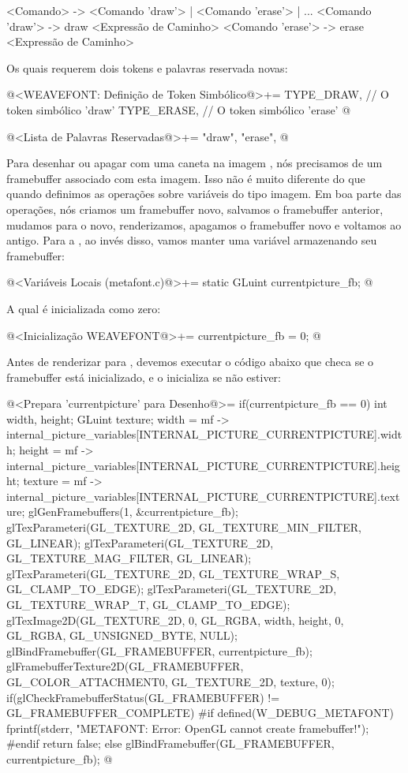{{{{{{\alinhaverbatim
<Comando> -> <Comando 'draw'> | <Comando 'erase'> | ...
<Comando 'draw'> -> draw <Expressão de Caminho>
<Comando 'erase'> -> erase <Expressão de Caminho>
\alinhanormal

Os quais requerem dois tokens e palavras reservada novas:

\iniciocodigo
@<WEAVEFONT: Definição de Token Simbólico@>+=
TYPE_DRAW,   // O token simbólico 'draw'
TYPE_ERASE,  // O token simbólico 'erase'
@
\fimcodigo

\iniciocodigo
@<Lista de Palavras Reservadas@>+=
"draw", "erase",
@
\fimcodigo


Para desenhar ou apagar com uma caneta na
imagem , nós precisamos de um framebuffer
associado com esta imagem. Isso não é muito diferente do que quando
definimos as operações sobre variáveis do tipo imagem. Em boa parte
das operações, nós criamos um framebuffer novo, salvamos o framebuffer
anterior, mudamos para o novo, renderizamos, apagamos o framebuffer
novo e voltamos ao antigo. Para a , ao
invés disso, vamos manter uma variável armazenando seu framebuffer:

\iniciocodigo
@<Variáveis Locais (metafont.c)@>+=
static GLuint currentpicture_fb;
@
\fimcodigo

A qual é inicializada como zero:

\iniciocodigo
@<Inicialização WEAVEFONT@>+=
currentpicture_fb = 0;
@
\fimcodigo

Antes de renderizar para , devemos executar
o código abaixo que checa se o framebuffer está inicializado, e o
inicializa se não estiver:

\iniciocodigo
@<Prepara 'currentpicture' para Desenho@>=
{
  if(currentpicture_fb == 0){
    int width, height;
    GLuint texture;
    width = mf ->
             internal_picture_variables[INTERNAL_PICTURE_CURRENTPICTURE].width;
    height = mf ->
            internal_picture_variables[INTERNAL_PICTURE_CURRENTPICTURE].height;
    texture = mf ->
           internal_picture_variables[INTERNAL_PICTURE_CURRENTPICTURE].texture;
    glGenFramebuffers(1, &currentpicture_fb);
    glTexParameteri(GL_TEXTURE_2D, GL_TEXTURE_MIN_FILTER, GL_LINEAR);
    glTexParameteri(GL_TEXTURE_2D, GL_TEXTURE_MAG_FILTER, GL_LINEAR);
    glTexParameteri(GL_TEXTURE_2D, GL_TEXTURE_WRAP_S, GL_CLAMP_TO_EDGE);
    glTexParameteri(GL_TEXTURE_2D, GL_TEXTURE_WRAP_T, GL_CLAMP_TO_EDGE);
    glTexImage2D(GL_TEXTURE_2D, 0, GL_RGBA, width, height, 0, GL_RGBA,
                 GL_UNSIGNED_BYTE, NULL);
    glBindFramebuffer(GL_FRAMEBUFFER, currentpicture_fb);
    glFramebufferTexture2D(GL_FRAMEBUFFER, GL_COLOR_ATTACHMENT0, GL_TEXTURE_2D,
                           texture, 0);
    if(glCheckFramebufferStatus(GL_FRAMEBUFFER) != GL_FRAMEBUFFER_COMPLETE){
#if defined(W_DEBUG_METAFONT)
      fprintf(stderr, "METAFONT: Error: OpenGL cannot create framebuffer!\n");
#endif
      return false;
    }
  }
  else
    glBindFramebuffer(GL_FRAMEBUFFER, currentpicture_fb);
}
@
\fimcodigo

}}}}}}
